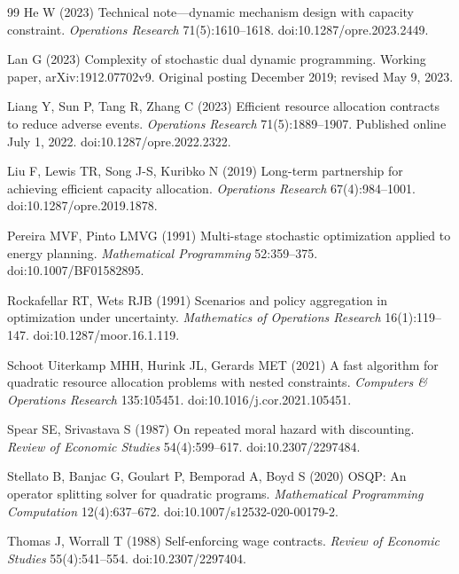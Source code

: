 \begin{thebibliography}{99}
He W (2023) Technical note---dynamic mechanism design with capacity constraint. \emph{Operations Research} 71(5):1610--1618. doi:10.1287/opre.2023.2449.

Lan G (2023) Complexity of stochastic dual dynamic programming. Working paper, arXiv:1912.07702v9. Original posting December 2019; revised May 9, 2023.

Liang Y, Sun P, Tang R, Zhang C (2023) Efficient resource allocation contracts to reduce adverse events. \emph{Operations Research} 71(5):1889--1907. Published online July 1, 2022. doi:10.1287/opre.2022.2322.

Liu F, Lewis TR, Song J-S, Kuribko N (2019) Long-term partnership for achieving efficient capacity allocation. \emph{Operations Research} 67(4):984--1001. doi:10.1287/opre.2019.1878.

Pereira MVF, Pinto LMVG (1991) Multi-stage stochastic optimization applied to energy planning. \emph{Mathematical Programming} 52:359--375. doi:10.1007/BF01582895.

Rockafellar RT, Wets RJB (1991) Scenarios and policy aggregation in optimization under uncertainty. \emph{Mathematics of Operations Research} 16(1):119--147. doi:10.1287/moor.16.1.119.

Schoot Uiterkamp MHH, Hurink JL, Gerards MET (2021) A fast algorithm for quadratic resource allocation problems with nested constraints. \emph{Computers \& Operations Research} 135:105451. doi:10.1016/j.cor.2021.105451.

Spear SE, Srivastava S (1987) On repeated moral hazard with discounting. \emph{Review of Economic Studies} 54(4):599--617. doi:10.2307/2297484.

Stellato B, Banjac G, Goulart P, Bemporad A, Boyd S (2020) OSQP: An operator splitting solver for quadratic programs. \emph{Mathematical Programming Computation} 12(4):637--672. doi:10.1007/s12532-020-00179-2.

Thomas J, Worrall T (1988) Self-enforcing wage contracts. \emph{Review of Economic Studies} 55(4):541--554. doi:10.2307/2297404.


\end{thebibliography}
